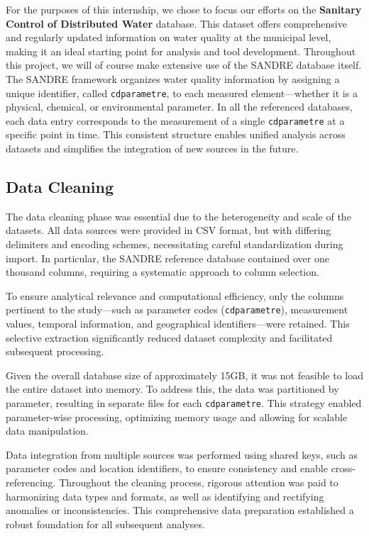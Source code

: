 \documentclass{article}
\begin{document}
For the purposes of this internship, we chose to focus our efforts on the \textbf{Sanitary Control of Distributed Water} database. This dataset offers comprehensive and regularly updated information on water quality at the municipal level, making it an ideal starting point for analysis and tool development.
Throughout this project, we will of course make extensive use of the SANDRE database itself. The SANDRE framework organizes water quality information by assigning a unique identifier, called \texttt{cdparametre}, to each measured element—whether it is a physical, chemical, or environmental parameter. In all the referenced databases, each data entry corresponds to the measurement of a single \texttt{cdparametre} at a specific point in time. This consistent structure enables unified analysis across datasets and simplifies the integration of new sources in the future.
\subsection{Data Cleaning}
The data cleaning phase was essential due to the heterogeneity and scale of the datasets. All data sources were provided in CSV format, but with differing delimiters and encoding schemes, necessitating careful standardization during import. In particular, the SANDRE reference database contained over one thousand columns, requiring a systematic approach to column selection.

To ensure analytical relevance and computational efficiency, only the columns pertinent to the study—such as parameter codes (\texttt{cdparametre}), measurement values, temporal information, and geographical identifiers—were retained. This selective extraction significantly reduced dataset complexity and facilitated subsequent processing.

Given the overall database size of approximately 15GB, it was not feasible to load the entire dataset into memory. To address this, the data was partitioned by parameter, resulting in separate files for each \texttt{cdparametre}. This strategy enabled parameter-wise processing, optimizing memory usage and allowing for scalable data manipulation.

Data integration from multiple sources was performed using shared keys, such as parameter codes and location identifiers, to ensure consistency and enable cross-referencing. Throughout the cleaning process, rigorous attention was paid to harmonizing data types and formats, as well as identifying and rectifying anomalies or inconsistencies. This comprehensive data preparation established a robust foundation for all subsequent analyses.
\end{document}
